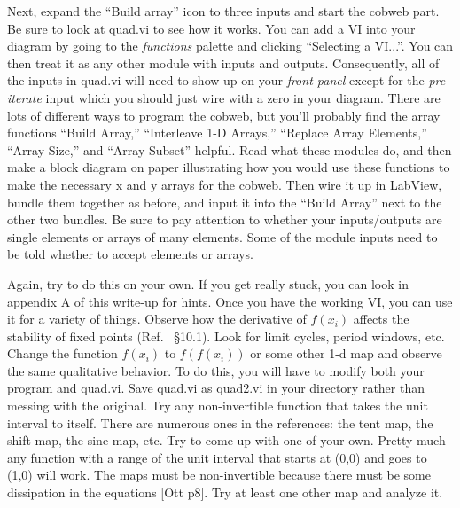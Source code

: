 \documentclass{../lab}
\begin{document}
Next, expand the ``Build array'' icon to three inputs and start the cobweb part. Be sure to look at quad.vi to see how it works. You can add a VI into your diagram by going to the \emph{functions} palette and clicking ``Selecting a VI...''. You can then treat it as any other module with inputs and outputs. Consequently, all of the inputs in quad.vi will need to show up on your \emph{front-panel} except for the \emph{pre-iterate} input which you should just wire with a zero in your diagram. There are lots of different ways to program the cobweb, but you'll probably find the array functions ``Build Array,'' ``Interleave 1-D Arrays,'' ``Replace Array Elements,'' ``Array Size,'' and ``Array Subset'' helpful. Read what these modules do, and then make a block diagram on paper illustrating how you would use these functions to make the necessary x and y arrays for the cobweb. Then wire it up in LabView, bundle them together as before, and input it into the ``Build Array'' next to the other two bundles. Be sure to pay attention to whether your inputs/outputs are single elements or arrays of many elements. Some of the module inputs need to be told whether to accept elements or arrays.

\newpage

Again, try to do this on your own. If you get really stuck, you can look in appendix A of this write-up for hints. Once you have the working VI, you can use it for a variety of things. Observe how the derivative of $f(x_i)$ affects the stability of fixed points (Ref.~\cite{Strogatz} \S10.1). Look for limit cycles, period windows, etc. Change the function $f(x_i)$ to $f(f(x_i))$ or some other 1-d map and observe the same qualitative behavior. To do this, you will have to modify both your program and quad.vi. Save quad.vi as quad2.vi in your directory rather than messing with the original. Try any non-invertible function that takes the unit interval to itself. There are numerous ones in the references: the tent map, the shift map, the sine map, etc. Try to come up with one of your own. Pretty much any function with a range of the unit interval that starts at (0,0) and goes to (1,0) will work. The maps must be non-invertible because there must be some dissipation in the equations [Ott \cite{Ott} p8]. Try at least one other map and analyze it.


\end{document}
